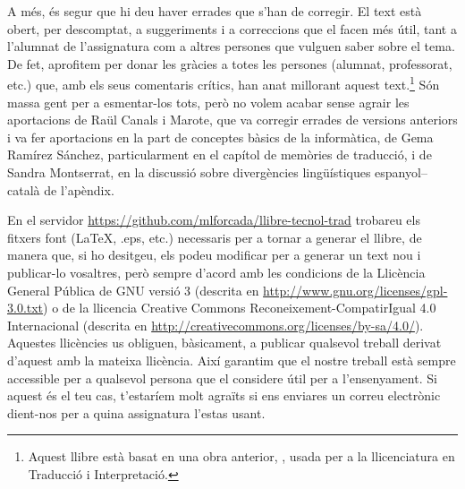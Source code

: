 A més, és segur que hi deu haver errades que s'han de corregir. El
text està obert, per descomptat, a suggeriments i a correccions que el
facen més útil, tant a l'alumnat de l'assignatura com a altres
persones que vulguen saber sobre el tema.  De fet, aprofitem per donar
les gràcies a totes les persones (alumnat, professorat, etc.)  que,
amb els seus comentaris crítics, han anat millorant aquest
text.\footnote{Aquest llibre està basat en una obra anterior,
  \protect\citep{forcada09b}, usada per a la llicenciatura en
  Traducció i Interpretació.}  Són massa gent per a esmentar-los tots,
però no volem acabar sense agrair les aportacions de Raül Canals i
Marote, que va corregir errades de versions anteriors i va fer
aportacions en la part de conceptes bàsics de la informàtica, de Gema
Ramírez Sánchez, particularment en el capítol de memòries de
traducció, i de Sandra Montserrat, en la discussió sobre divergències
lingüístiques espanyol--català de l'apèndix.

En el servidor \url{https://github.com/mlforcada/llibre-tecnol-trad}
trobareu els fitxers font (\LaTeX, .eps, etc.) necessaris per a tornar
a generar el llibre, de manera que, si ho desitgeu, els podeu
modificar per a generar un text nou i publicar-lo vosaltres, però
sempre d'acord amb les condicions de la Llicència General Pública de
GNU versió 3 (descrita en
\url{http://www.gnu.org/licenses/gpl-3.0.txt}) o de la llicencia
Creative Commons Reconeixement-CompatirIgual 4.0 Internacional
(descrita en
\url{http://creativecommons.org/licenses/by-sa/4.0/}). Aquestes
llicències us obliguen, bàsicament, a publicar qualsevol treball
derivat d'aquest amb la mateixa llicència. Així garantim que el nostre
treball està sempre accessible per a qualsevol persona que el
considere útil per a l'ensenyament. Si aquest és el teu cas,
t'estaríem molt agraïts si ens enviares un correu electrònic dient-nos
per a quina assignatura l'estas usant.
